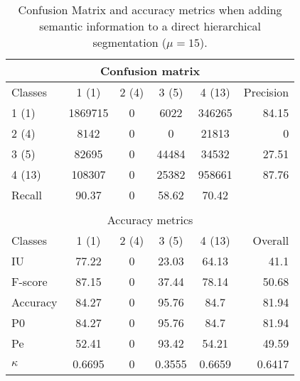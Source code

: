 \begin{table}[H]
\begin{center}
\begin{tabular}{|l|c|c|c|c|r|}
\hline
\multicolumn{6}{|c|}{Confusion matrix} \\
\hline
 Classes & 1 (1) & 2 (4) & 3 (5) & 4 (13) & Precision \\
\hline
1 (1) & 1869715 & 0 & 6022 & 346265 & 84.15 \\
\hline
2 (4) & 8142 & 0 & 0 & 21813 & 0 \\
\hline
3 (5) & 82695 & 0 & 44484 & 34532 & 27.51 \\
\hline
4 (13) & 108307 & 0 & 25382 & 958661 & 87.76 \\
\hline
Recall & 90.37 & 0 & 58.62 & 70.42 &  \\
\hline
\multicolumn{6}{c}{ } \\
\hline
\multicolumn{6}{|c|}{Accuracy metrics} \\
\hline
 Classes & 1 (1) & 2 (4) & 3 (5) & 4 (13) & Overall \\
\hline
IU & 77.22 & 0 & 23.03 & 64.13 & 41.1 \\
\hline
F-score & 87.15 & 0 & 37.44 & 78.14 & 50.68 \\
\hline
Accuracy & 84.27 & 0 & 95.76 & 84.7 & 81.94 \\
\hline
P0 & 84.27 & 0 & 95.76 & 84.7 & 81.94 \\
\hline
Pe & 52.41 & 0 & 93.42 & 54.21 & 49.59 \\
\hline
$\kappa$ & 0.6695 & 0 & 0.3555 & 0.6659 & 0.6417 \\
\hline
\end{tabular}
\caption{Confusion Matrix and accuracy metrics when adding semantic information to a direct hierarchical segmentation ($\mu=15$).}
\label{table:C3_S2_seg_hierar}
\end{center}
\end{table}